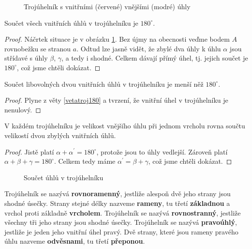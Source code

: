 \begin{figure}[h!]
  \centering
  \caption{Trojúhelník s vnitřními (červené) vnějšími (modré) úhly}
\end{figure}

\begin{veta}\label{vetatroj180}
  Součet všech vnitřních úhlů v trojúhelníku je $180^\circ$.
\end{veta}

\begin{proof}
    Náčrtek situace je v obrázku \ref{dktroj}. Bez újmy na obecnosti veďme bodem $A$ rovnobežku se stranou $a$.
    Odtud lze jasně vidět, že zbylé dva úhly k úhlu $\alpha$ jsou střídavé s
    úhly $\beta$, $\gamma$, a tedy i shodné. Celkem dávají přímý úhel,
    tj. jejich součet je $180^\circ$, což jsme chtěli dokázat.
\end{proof}

\begin{veta}
  Součet libovolných dvou vnitřních úhlů v trojúhelníku je menší něž $180^\circ$.
\end{veta}

\begin{proof}
  Plyne z věty \ref{vetatroj180} a tvrzení, že vnitřní úhel v trojúhelníku je nenulový.
\end{proof}

\begin{veta}
  V každém trojúhelníku je velikost vnějšího úhlu při jednom vrcholu rovna součtu velikostí dvou zbylých vnitřních úhlů.
\end{veta}

\begin{proof}
  Jistě platí $\alpha + \alpha^\prime = 180^\circ$, protože jsou to úhly
  vedlejší. Zároveň platí $\alpha + \beta + \gamma = 180^\circ$. Celkem
  tedy máme $\alpha^\prime = \beta + \gamma$, což jsme chtěli dokázat.
\end{proof}

\begin{figure}[ht!]
  \centering
  \caption{Součet úhlů v trojúhelníku}
  \label{dktroj}
\end{figure}

\begin{definition}
  Trojúhelník se nazývá \textbf{rovnoramenný}, jestliže alespoň dvě jeho strany jsou shodné úsečky. Strany stejné délky nazveme \textbf{rameny}, tu třetí \textbf{základnou} a vrchol proti základně \textbf{vrcholem}.
  Trojúhelník se nazývá \textbf{rovnostranný}, jestliže všechny tři jeho strany jsou shodné úsečky.
  Trojúhelník se nazývá \textbf{pravoúhlý}, jestliže je jeden jeho vnitřní úhel pravý. Dvě strany, které jsou rameny pravého úhlu nazveme \textbf{odvěsnami}, tu třetí \textbf{přeponou}.
\end{definition}

